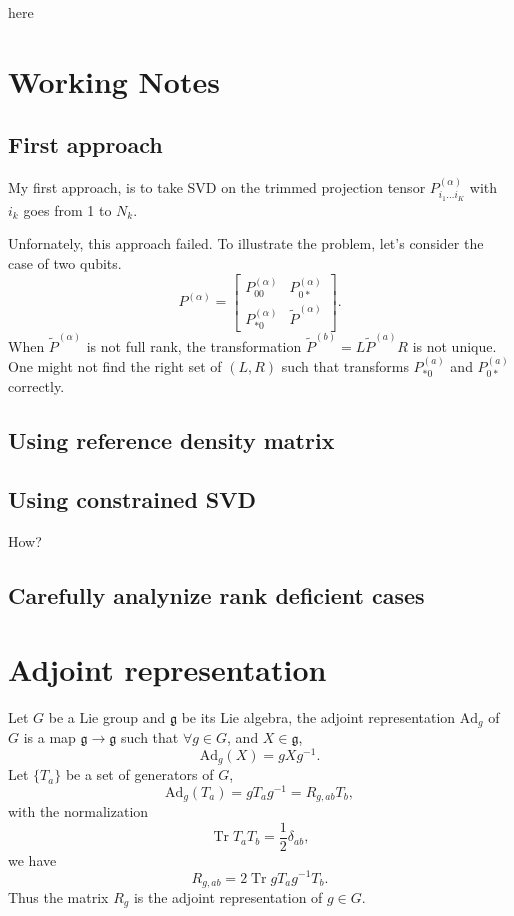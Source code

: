 \documentclass{article}
\DeclareMathOperator{\Tr}{Tr}
\begin{document}
{\Huge here}
\section{Working Notes}
\subsection{First approach}
My first approach, is to take SVD on the trimmed projection tensor
$P^{(\alpha)}_{i_1\ldots i_K}$ with $i_k$ goes from 1 to $N_k$.


Unfornately, this approach failed.  To illustrate the problem, let's
consider the case of two qubits.
\begin{equation}
  P^{(\alpha)} = \begin{bmatrix}
    P^{(\alpha)}_{00} & P^{(\alpha)}_{0*} \\
    P^{(\alpha)}_{*0} & \tilde P^{(\alpha)}
  \end{bmatrix}.
\end{equation}
When $\tilde P^{(\alpha)}$ is not full rank, the transformation
$\tilde P^{(b)} = L\tilde P^{(a)} R$ is not unique.  One might not
find the right set of $(L, R)$ such that transforms $P^{(a)}_{*0}$
and $P^{(a)}_{0*}$ correctly.

\subsection{Using reference density matrix}

\subsection{Using constrained SVD}
How?

\subsection{Carefully analynize rank deficient cases}

\appendix
\section{Adjoint representation}
\label{appendix:adj_rep}
Let $G$ be a Lie group and $\mathfrak{g}$ be its Lie algebra, the adjoint
representation $\text{Ad}_g$ of $G$ is a map
$\mathfrak{g}\rightarrow\mathfrak{g}$ such that $\forall g\in G$, and
$X \in \mathfrak{g}$,
\begin{equation}
  \text{Ad}_g(X) = gXg^{-1}.
\end{equation}
Let $\{T_a\}$ be a set of generators of $G$,
\begin{equation}
  \text{Ad}_g(T_a) = gT_ag^{-1} = R_{g,ab}T_b,
\end{equation}
with the normalization
\begin{equation}
  \Tr T_aT_b = \frac12\delta_{ab},
\end{equation}
we have
\begin{equation}
  R_{g,ab} = 2\Tr gT_ag^{-1}T_b.
\end{equation}
Thus the matrix $R_g$ is the adjoint representation of $g\in G$.
\end{document}
